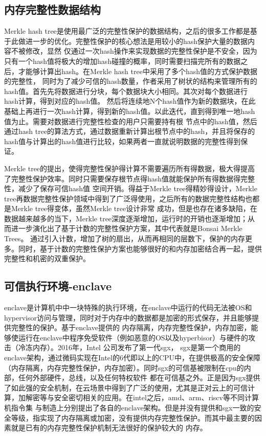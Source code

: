 \subsection{内存完整性数据结构}
Merkle hash tree是使用最广泛的完整性保护的数据结构，之后的很多工作都是基于此做进一步的优化。完整性保护的核心想法是用较小的hash保护大量的数据内容不被修改，显然
仅通过一次hash操作来实现数据的完整性保护是不安全，因为只有一个hash值将极大的增加hash碰撞的概率，同时需要扫描完所有的数据之后，才能够计算出hash。在Merkle hash tree中采用了多个hash值的方式保护数据的完整性，
同时为了减少可信的hash数量，作者采用了树状的结构来管理所有的hash值。首先先将数据进行分块，每个数据块大小相同。其次对每个数据进行hash计算，得到对应的hash值。
然后将连续地N个hash值作为新的数据块，在此基础上再进行一次hash计算，得到新的hash值。以此迭代，直到得到唯一地hash值为止。需要对数据进行完整性检查的用户只需要持有根
节点中的hash值，然后通过hash tree的算法方式，通过数据重新计算出根节点中的hash，并且将保存的hash值与计算出的hash值进行比较，如果两者一直就说明数据的完整性得到保证。

Merkle tree的提出，使得完整性保护得计算不需要遍历所有得数据，极大得提高了完整性保护效率。同时只需要保存根节点得hash值就能保护所有得数据得完整性，减少了保存可信hash值
空间开销。得益于Merkle tree得精妙得设计，Merkle tree再数据完整性保护领域中得到了广泛得使用，之后所有的数据完整性结构也都是Merkle tree得变体，虽然Merkle tree设计非常
成功，但是也存在诸多缺陷，在数据越来越多的当下，Merkle tree深度逐渐增加，运行时的开销也逐渐增加；从而进一步演化出了基于计数的完整性保护方案，其中代表就是Bonsai Merkle Trees。
通过引入计数，增加了树的扇出，从而再相同的层数下，保护的内存更多。同时，基于计数的完整性保护方案也能够很好的和内存加密结合再一起，提供完整性和机密的双重保护。

\subsection{可信执行环境-enclave}
enclave是计算机中中一块特殊的执行环境，在enclave中运行的代码无法被OS和hypervisor访问与管理，同时对于内存中的数据都是加密的形式保存，并且能够提供完整性的保护。基于enclave提供的
内存隔离，内存完整性保护，内存加密，能够使运行在enclave中程序免受软件（例如恶意的OS以及hyperbisor）与硬件的攻击（冷冻内存）。2016年，Intel 公司发布了第一代sgx， sgx是第一个商用的
enclave架构，通过微码实现在Intel的6代即以上的CPU中，在提供极高的安全保障（内存隔离，内存完整性保护，内存加密）。同时sgx的可信基被限制在cpu的内部，任何外部硬件，总线，以及任何特权软件
都在可信基之外。正是因为sgx提供了如此强的安全机制，在云场景中得到了广泛的使用，尤其是正对云上的可信计算，加解密等与安全密切相关的应用。在intel之后，amd、arm、riscv等不同计算机指令集
与制造上分别提出了各自的enclave架构。但是并没有提供和sgx一致的安全等级，指实现了内存隔离或加密，没有提供内存完整性保护。而其中最主要的因素就是已有的内存完整性保护机制无法很好的保护较大的
内存。

